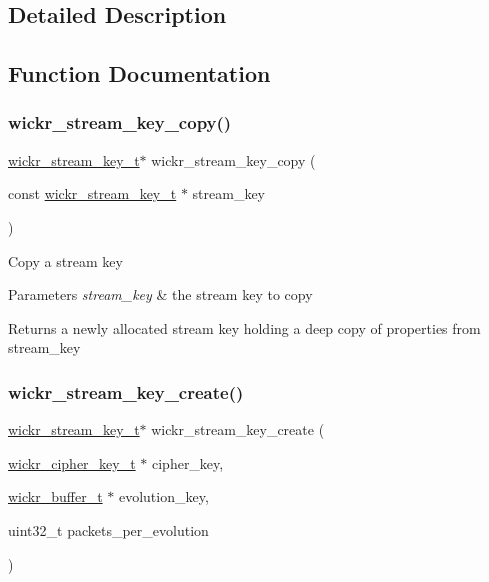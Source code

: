 \subsection{Detailed Description}


\subsection{Function Documentation}
\mbox{\label{group__wickr__stream__key_ga0201dd73adf773834d7dbb4bbc307fae}} 
\subsubsection{\texorpdfstring{wickr\_stream\_key\_copy()}{wickr\_stream\_key\_copy()}}
{\footnotesize\ttfamily \mbox{\hyperlink{structwickr__stream__key}{wickr\+\_\+stream\+\_\+key\+\_\+t}}$\ast$ wickr\+\_\+stream\+\_\+key\+\_\+copy (\begin{DoxyParamCaption}\item[{const \mbox{\hyperlink{structwickr__stream__key}{wickr\+\_\+stream\+\_\+key\+\_\+t}} $\ast$}]{stream\+\_\+key }\end{DoxyParamCaption})}

Copy a stream key


\begin{DoxyParams}{Parameters}
{\em stream\+\_\+key} & the stream key to copy \\
\hline
\end{DoxyParams}
\begin{DoxyReturn}{Returns}
a newly allocated stream key holding a deep copy of properties from \textquotesingle{}stream\+\_\+key\textquotesingle{} 
\end{DoxyReturn}
\mbox{\label{group__wickr__stream__key_ga54449667a25d9e64cd04dae58dd76418}} 
\subsubsection{\texorpdfstring{wickr\_stream\_key\_create()}{wickr\_stream\_key\_create()}}
{\footnotesize\ttfamily \mbox{\hyperlink{structwickr__stream__key}{wickr\+\_\+stream\+\_\+key\+\_\+t}}$\ast$ wickr\+\_\+stream\+\_\+key\+\_\+create (\begin{DoxyParamCaption}\item[{\mbox{\hyperlink{structwickr__cipher__key}{wickr\+\_\+cipher\+\_\+key\+\_\+t}} $\ast$}]{cipher\+\_\+key,  }\item[{\mbox{\hyperlink{structwickr__buffer}{wickr\+\_\+buffer\+\_\+t}} $\ast$}]{evolution\+\_\+key,  }\item[{uint32\+\_\+t}]{packets\+\_\+per\+\_\+evolution }\end{DoxyParamCaption})}


